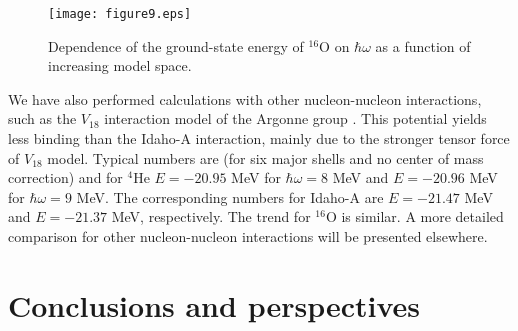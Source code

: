 \documentclass[aps,prc,twocolumn,floatfix]{revtex4}
\begin{document}
\begin{figure}
\vspace{0.25in}
\texttt{[image: figure9.eps]}
\caption{Dependence of the ground-state energy of $^{16}$O  on $\hbar\omega$
as a function of increasing model space.}
\label{fig_ox_hw}
\end{figure}
We have also performed calculations with other nucleon-nucleon interactions, 
such as the 
$V_{18}$ interaction model of the Argonne group \cite{bob95}. This potential 
yields less binding than the Idaho-A interaction, mainly due to the stronger tensor 
force of $V_{18}$ model. Typical numbers are (for six major shells and no
center of mass correction) and for
$^{4}$He $E=-20.95$ MeV for $\hbar\omega =8$ MeV and 
$E=-20.96$ MeV for $\hbar\omega=9$ MeV.
The corresponding numbers for Idaho-A
are $E=-21.47$  MeV and  $E=-21.37$ MeV, respectively.
The trend for $^{16}$O is similar. A more detailed comparison for other
nucleon-nucleon interactions will be presented elsewhere.

\section{Conclusions and perspectives}
\label{sec:conclusion}
\end{document}
